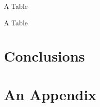 \documentclass[12pt, a4paper, twoside, numbers=enddot, bibliography=totoc, listof=totoc, headings=optiontoheadandtoc]{uniudthesis}
\begin{document}
					\begin{table}[h!]
						\caption{A Table}
					\end{table}
					
					\begin{table}[h!]
						\caption{A Table}
					\end{table}
	
	\chapter{Conclusions}
		\lipsum[1]

	\appendix
	\chapter{An Appendix}
		\lipsum[1]
\end{document}
